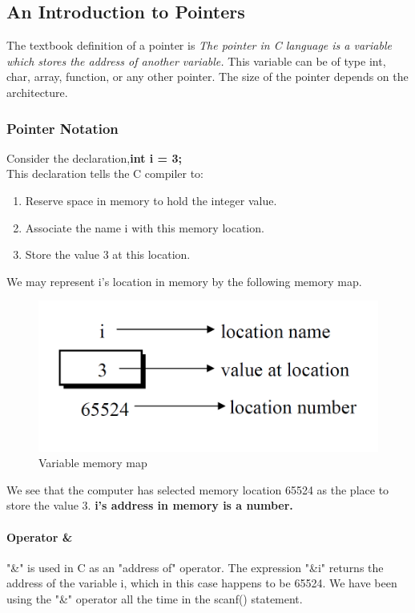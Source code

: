 \subsection{An Introduction to Pointers}
The textbook definition of a pointer is \textit{The pointer in C language is a variable which stores the address of another variable.} This variable can be of type int, char, array, function, or any other pointer. The size of the pointer depends on the architecture. 

\subsubsection{Pointer Notation}
Consider the declaration,\quad \textbf{int i = 3;}\\
This declaration tells the C compiler to:
\begin{enumerate}
    \item Reserve space in memory to hold the integer value.
    \item Associate the name i with this memory location.
    \item Store the value 3 at this location.
\end{enumerate}
We may represent i’s location in memory by the following memory map.
\begin{figure}[H]
    \begin{center}
        \includegraphics[width=\textwidth]{images/pointer.png}
        \caption{Variable memory map}
        \label{pointer}
    \end{center}
\end{figure}

We see that the computer has selected memory location 65524 as the place to store the value 3. \textbf{i’s address in memory is a number.}

\paragraph{Operator \&} "\&" is used in  C as an "address of" operator. The expression "\&i" returns the address of the variable i, which in this case happens to be 65524. We have been using the "\&" operator all the time in the scanf() statement.

